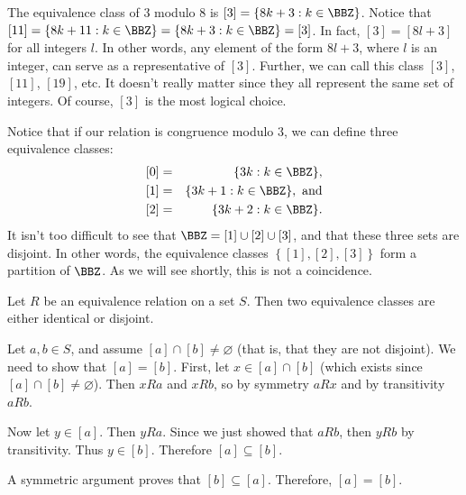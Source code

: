 \begin{exa}
The equivalence class of $3$ modulo $8$ is 
$[3]=\{8k+3 : k\in\BBZ\}$.
Notice that 
$[11]=\{8k+11 : k\in\BBZ\}=\{8k+3 : k\in\BBZ\}=[3]$.
In fact, $[3]=[8l+3]$ for all integers $l$.
In other words, any element of the form $8l+3$, where $l$ is an integer,
can serve as a representative of $[3]$.
Further, we can call this class $[3]$, $[11]$, $[19]$, etc.  It doesn't really
matter since they all represent the same set of integers.  
Of course, $[3]$ is the most logical choice.
\end{exa}

\begin{exa}
Notice that if our relation is congruence modulo $3$, we can define three
equivalence classes:
\begin{eqnarray*}
{[}0{]}&=&\{3k : k\in\BBZ\},\\
{[}1{]}&=&\{3k+1 : k\in\BBZ\}, \mbox{ and}\\
{[}2{]}&=&\{3k+2 : k\in\BBZ\}.\\
\end{eqnarray*}
It isn't too difficult to see that $\BBZ=[1]\cup[2]\cup[3]$,
and that these three sets are disjoint.
In other words, the equivalence classes $\left\{[1],[2],[3]\right\}$ form a partition of $\BBZ$.  
As we will see shortly, this is not a coincidence.
\end{exa}


\begin{lem}\label{lem:equiv}
Let $R$ be an equivalence relation on a set $S$. Then
two equivalence classes are either identical or disjoint.
\label{lem:equiv_classes}
\begin{pf}
Let $a, b\in S$, and assume $[a]\cap [b] \neq
\varnothing$ (that is, that they are not disjoint).  
We need to show that $[a] = [b]$. 
First, let $x\in [a]\cap [b]$ (which exists since $[a]\cap [b] \neq \varnothing$).
Then $x R a$ and $x R b$, so by symmetry $a R x$ and by transitivity $a R b$.

Now let $y\in [a]$.  Then $y R a$. Since we just showed that $a R b$,  
then $y R b$ by transitivity.  
Thus $y\in[b]$.
Therefore $[a]\subseteq [b]$.  

A symmetric argument proves that $[b]\subseteq [a]$.
Therefore, $[a]=[b]$.
\end{pf}
\end{lem}

